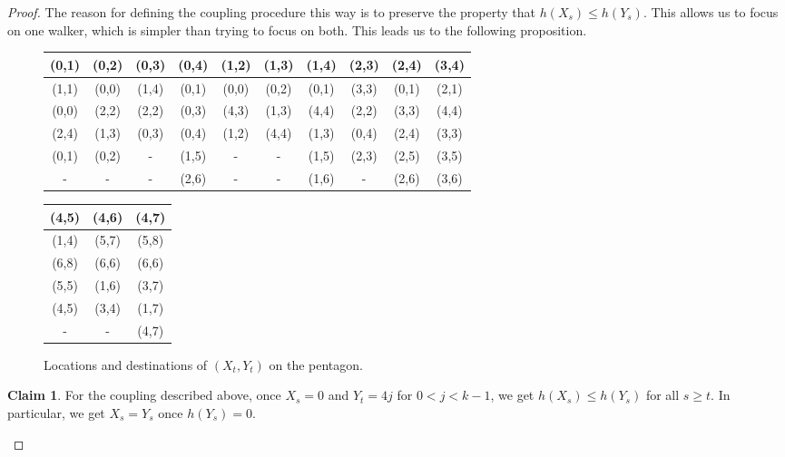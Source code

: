 \documentclass[10pt,a4paper]{amsart}
\theoremstyle{definition}
\numberwithin{definition}{section}
\newtheorem{claim}[definition]{Claim}
\begin{document}
\begin{proof}
The reason for defining the coupling procedure this way is to preserve the property that $h(X_s) \leq h(Y_s)$. This allows us to focus on one walker, which is simpler than trying to focus on both. This leads us to the following proposition.

\begin{figure}

\begin{center}
 \begin{tabular}{||c c c c c c c c c c||} 
 \hline
 (0,1) & (0,2) & (0,3) & (0,4) & (1,2) & (1,3) & (1,4) & (2,3) & (2,4) & (3,4)\\ [0.5ex] 
 \hline\hline
 (1,1) & (0,0) & (1,4) & (0,1) & (0,0) & (0,2) & (0,1) & (3,3) & (0,1) & (2,1)\\ 
 \hline
 (0,0) & (2,2) & (2,2) & (0,3) & (4,3) & (1,3) & (4,4) & (2,2) & (3,3) & (4,4)\\
 \hline
 (2,4) & (1,3) & (0,3) & (0,4) & (1,2) & (4,4) & (1,3) & (0,4) & (2,4) & (3,3)\\
 \hline
 (0,1) & (0,2) & - & (1,5) & - & - & (1,5) & (2,3) & (2,5) & (3,5)\\
 \hline
 - & - & - & (2,6) & - & -  & (1,6) & - & (2,6) & (3,6)\\ [1ex]

 \hline
\end{tabular}
\end{center}

\begin{center}
 \begin{tabular}{||c c c ||} 
 \hline
 (4,5) & (4,6) & (4,7) \\ [0.5ex] 
 \hline\hline
 (1,4) & (5,7) & (5,8) \\ 
 \hline
 (6,8) & (6,6) & (6,6) \\
 \hline
 (5,5) & (1,6) & (3,7) \\
 \hline
 (4,5) & (3,4) & (1,7) \\
 \hline
 - & - & (4,7) \\ [1ex]

 \hline
\end{tabular}
\end{center}
\caption{Locations and destinations of $(X_t, Y_t)$ on the pentagon.}
\label{tb:move1}
\end{figure}


\begin{claim}
For the coupling described above, once $X_s = 0$ and $Y_t = 4j$ for $0 < j < k-1$, we get $h(X_s) \leq h(Y_s)$ for all $s \geq t$. In particular, we get $X_s = Y_s$ once $h(Y_s) = 0$.
\end{claim}


\end{proof}
\end{document}
